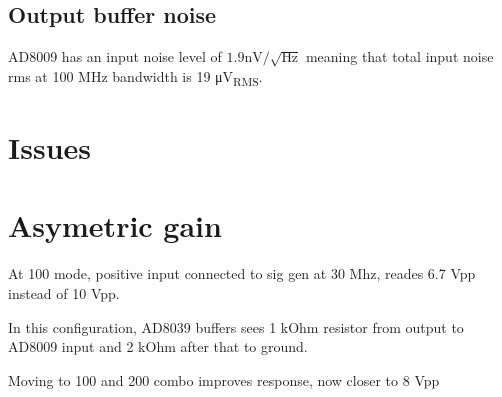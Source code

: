 \documentclass[11pt]{article}
\begin{document}
\subsection{Output buffer noise}
AD8009 has an input noise level of $1.9 \si{\nano \volt} / \sqrt{\si{\hertz}}$ meaning 
that total input noise rms at 100 \si{\mega \hertz} bandwidth is 19 \si{\micro \volt_{RMS}}.

\section{Issues}

\section{Asymetric gain}

At 100 mode, positive input connected to sig gen at 30 Mhz, reades 6.7 Vpp instead of 
10 Vpp.

In this configuration, AD8039 buffers sees 1 kOhm resistor from output to 
AD8009 input and 2 kOhm after that to ground.

Moving to 100 and 200 combo improves response, now closer to 8 Vpp
\end{document}
